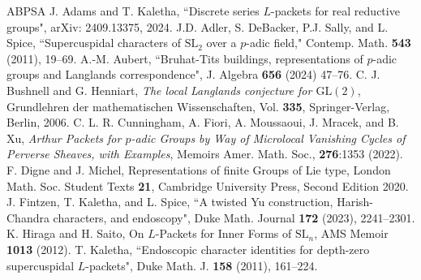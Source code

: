 \documentclass[11pt]{amsart}
\numberwithin{equation}{section}
\def\GL{\mathrm{GL}}
\def\SL{\mathrm{SL}}
\newcommand{\<}{\left\langle}
\renewcommand{\>}{\right\rangle}
\begin{document}
\begin{thebibliography}{ABPSA}
 J. Adams and T. Kaletha, ``Discrete series $L$-packets for real reductive groups", arXiv: 2409.13375, 2024.
 J.D.  Adler, S. DeBacker, P.J. Sally, and L. Spice, ``Supercuspidal characters of $\SL_2$ over a $p$-adic field," Contemp. Math. \textbf{543} (2011), 19--69.
 A.-M. Aubert, ``Bruhat-Tits buildings, representations of $p$-adic groups and Langlands correspondence", J. Algebra \textbf{656} (2024) 47--76.
 C. J. Bushnell and G. Henniart, \textit{The local Langlands conjecture for $\GL(2)$}, Grundlehren der mathematischen Wissenschaften, Vol. \textbf{335}, Springer-Verlag, Berlin, 2006. 
  C. L. R. Cunningham, A. Fiori,  A. Moussaoui, J. Mracek, and B. Xu, \textit{Arthur Packets for $p$-adic Groups by Way of Microlocal Vanishing Cycles of Perverse Sheaves, with Examples}, Memoirs  Amer. Math. Soc., \textbf{276}:1353 (2022).    
 F. Digne and J. Michel, Representations of finite Groups of Lie type, London Math. Soc. Student Texts \textbf{21}, Cambridge University Press, Second Edition 2020.
 J. Fintzen, T. Kaletha, and L. Spice, ``A twisted Yu construction, Harish-Chandra characters, and endoscopy", Duke Math. Journal \textbf{172} (2023), 2241--2301. 
 K. Hiraga and H. Saito, On $L$-Packets for Inner Forms of $\SL_n$,  AMS Memoir \textbf{1013} (2012).     
 T. Kaletha, ``Endoscopic character identities for depth-zero supercuspidal $L$-packets",  Duke Math. J. \textbf{158} (2011), 161--224.

\end{thebibliography}
\end{document}
